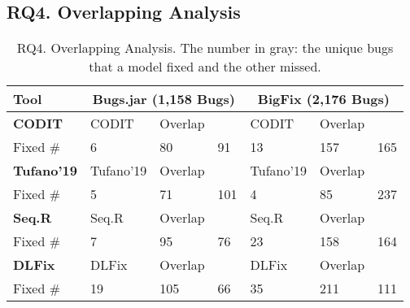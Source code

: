 \subsection{\bf RQ4. Overlapping Analysis}
\label{sec:overlap}

{\footnotesize{
\begin{table}[t]
  \caption{RQ4. Overlapping Analysis. The number in gray: the unique bugs that a model fixed and the other missed.}
  \vspace{-9pt}
	\begin{center}
		\renewcommand{\arraystretch}{1}
		\begin{tabular}{p{1cm}<{\centering}|p{0.9cm}<{\centering}|p{1cm}<{\centering}|p{0.7cm}<{\centering}|p{0.9cm}<{\centering}|p{0.8cm}<{\centering}|p{0.7cm}<{\centering}}\hline
			Tool &\multicolumn{3}{c|}{Bugs.jar (1,158 Bugs)}&\multicolumn{3}{c}{BigFix (2,176 Bugs)}\\
			\hline
			{\bf CODIT}             & CODIT   & Overlap   & \tool  & CODIT   & Overlap   & {\tool} \\
			\hline
			Fixed \#     & \cellcolor{mygray} 6  & 80   & \cellcolor{mygray} 91  & \cellcolor{mygray} 13 &  157  & \cellcolor{mygray} 165 \\
			\hline
			{\bf Tufano'19}             & Tufano'19   & Overlap   & \tool  & Tufano'19   & Overlap   & \tool \\
			\hline
			Fixed \#     & \cellcolor{mygray} 5  &  71  & \cellcolor{mygray} 101 & \cellcolor{mygray}4 & 85   & \cellcolor{mygray}237 \\
			\hline
			{\bf Seq.R}             & Seq.R   & Overlap   & \tool  & Seq.R   & Overlap   & \tool \\
			\hline
			Fixed \#     & \cellcolor{mygray} 7  &   95 & \cellcolor{mygray} 76 & \cellcolor{mygray} 23 &  158  & \cellcolor{mygray} 164 \\
			\hline
			{\bf DLFix} & DLFix   & Overlap   & \tool  & DLFix   & Overlap   & \tool \\
			\hline
			Fixed \#     & \cellcolor{mygray}  19 &  105  & \cellcolor{mygray} 66 & \cellcolor{mygray}35 &  211  & \cellcolor{mygray}111 \\

\end{tabular}
\end{center}
\end{table}}}
